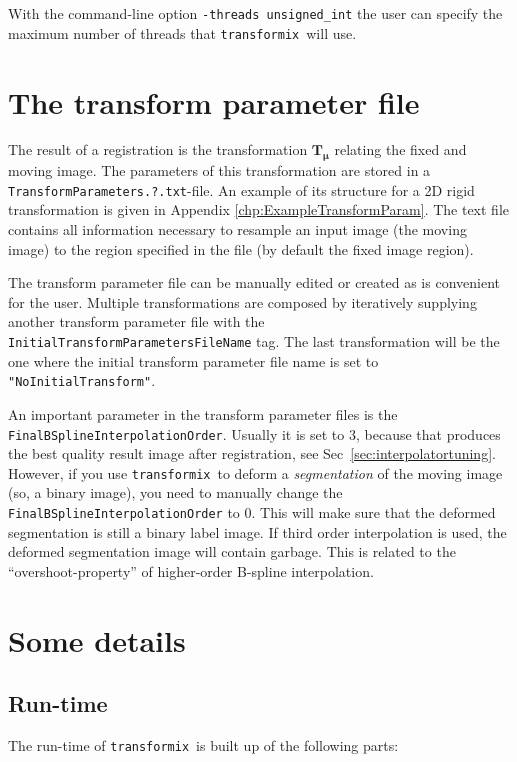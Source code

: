 \documentclass[]{report}
\newcommand{\transformix}{\texttt{transformix}}
\newcommand{\vmu}{\bm{\mu}}
\newcommand{\vTm}{\bm{T}_{\vmu}}
\begin{document}
With the command-line option \texttt{-threads unsigned\_int} the
user can specify the maximum number of threads that \transformix\
will use.

\section{The transform parameter file}\label{sec:transformix:tp}

The result of a registration is the transformation $\vTm$ relating
the fixed and moving image. The parameters of this transformation
are stored in a \texttt{TransformParameters.?.txt}-file. An
example of its structure for a 2D rigid transformation is given in
Appendix \ref{chp:ExampleTransformParam}. The text file contains
all information necessary to resample an input image (the moving
image) to the region specified in the file (by default the fixed
image region).

The transform parameter file can be manually edited or created as
is convenient for the user. Multiple transformations are composed
by iteratively supplying another transform parameter file with the
\texttt{InitialTransformParametersFileName} tag. The last
transformation will be the one where the initial transform
parameter file name is set to \texttt{"NoInitialTransform"}.

An important parameter in the transform parameter files is the
\texttt{FinalBSplineInterpolationOrder}. Usually it is set to 3, because that
produces the best quality result image after registration, see
Sec~\ref{sec:interpolatortuning}. However, if you use \transformix\ to deform a
\emph{segmentation} of the moving image (so, a binary image), you need to
manually change the \texttt{FinalBSplineInterpolationOrder} to 0. This will
make sure that the deformed segmentation is still a binary label image. If
third order interpolation is used, the deformed segmentation image will contain
garbage. This is related to the ``overshoot-property'' of higher-order B-spline
interpolation.

\section{Some details}

\subsection{Run-time}

The run-time of \transformix\ is built up of the following parts:
\end{document}
